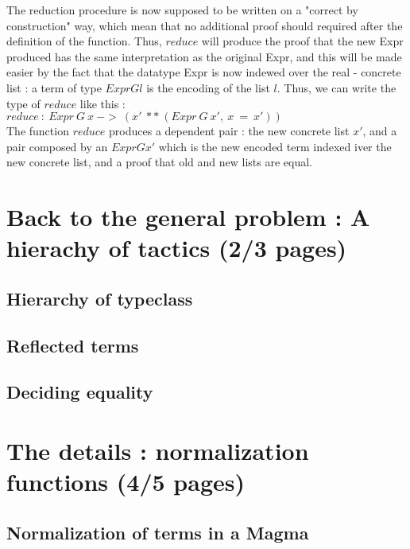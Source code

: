 \documentclass{sigplanconf}
\begin{document}
The reduction procedure is now supposed to be written on a "correct by construction" way, which mean that no additional proof should required after the definition of the function. Thus, $reduce$ will produce the proof that the new Expr produced has the same interpretation as the original Expr, and this will be made easier by the fact that the datatype Expr is now indewed over the real - concrete list : a term of type $Expr G l$ is the encoding of the list $l$.
Thus, we can write the type of $reduce$ like this : \\
$reduce\ :\ Expr\ G\ x\ ->\ (x'\ **\ (Expr\ G\ x',\ x\ =\ x'))$ \\
The function $reduce$ produces a dependent pair : the new concrete list $x'$, and a pair composed by an $Expr G x'$ which is the new encoded term indexed iver the new concrete list, and a proof that old and new lists are equal.
 










\section {Back to the general problem : A hierachy of tactics (2/3 pages)}

	\subsection {Hierarchy of typeclass}

	\subsection {Reflected terms}

	\subsection {Deciding equality}

\section {The details : normalization functions (4/5 pages)}

	\subsection {Normalization of terms in a Magma}
\end{document}
